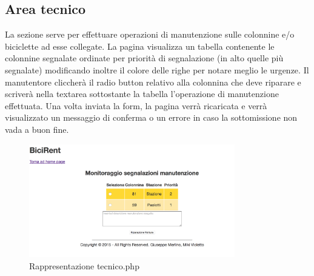 \documentclass[a4paper,twoside]{article}
\begin{document}
\subsection{Area tecnico}
La sezione serve per effettuare operazioni di manutenzione sulle colonnine e/o biciclette ad esse collegate. La pagina visualizza un tabella contenente le colonnine segnalate ordinate per priorità di segnalazione (in alto quelle più segnalate) modificando inoltre il colore delle righe per notare meglio le urgenze. Il manutentore cliccherà il radio button relativo alla colonnina che deve riparare e scriverà nella textarea sottostante la tabella l'operazione di manutenzione effettuata. Una volta inviata la form, la pagina verrà ricaricata e verrà visualizzato un messaggio di conferma o un errore in caso la sottomissione non vada a buon fine.
\begin{figure}[H]
	\centering
	\includegraphics[width=0.8\textwidth]{Screenshot04}
	\caption{Rappresentazione tecnico.php}
\end{figure}
\end{document}
